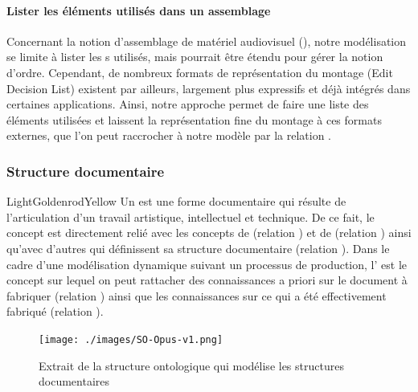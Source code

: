 \paragraph{Lister les éléments utilisés dans un assemblage}
Concernant la notion d'assemblage de matériel audiovisuel (), notre modélisation se limite à lister les s utilisés, mais pourrait être étendu pour gérer la notion d'ordre.
Cependant, de nombreux formats de représentation du montage (Edit Decision List) existent par ailleurs, largement plus expressifs et déjà intégrés dans certaines applications. 
Ainsi, notre approche permet de faire une liste des éléments utilisées et laissent la représentation fine du montage à ces formats externes, que l'on peut raccrocher à notre modèle par la relation .


\subsubsection*{Structure documentaire}
\begin{cadrecol}{LightGoldenrodYellow}
Un  est une forme documentaire qui résulte de l'articulation d'un travail artistique, intellectuel et technique.
De ce fait, le concept  est directement relié avec les concepts de  (relation ) et de  (relation ) ainsi qu'avec d'autres  qui définissent sa structure documentaire (relation ).
Dans le cadre d'une modélisation dynamique suivant un processus de production, l' est le concept sur lequel on peut rattacher des connaissances a priori sur le document à fabriquer (relation ) ainsi que les connaissances sur ce qui a été effectivement fabriqué (relation ).
\end{cadrecol}

\begin{figure}[htb!]
\centering
\texttt{[image: ./images/SO-Opus-v1.png]}
\caption{Extrait de la structure ontologique qui modélise les structures documentaires}
\label{img:so-opus}
\end{figure}

